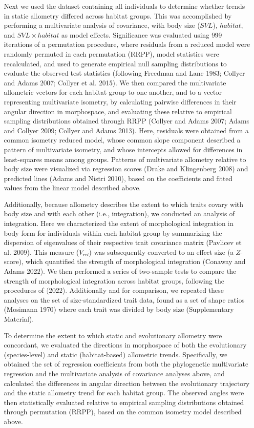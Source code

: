 \documentclass[
  11pt,
]{article}
\begin{document}
Next we used the dataset containing all individuals to determine whether
trends in static allometry differed across habitat groups. This was
accomplished by performing a multivariate analysis of covariance, with
body size (\(SVL\)), \(habitat\), and \(SVL \times habitat\) as model
effects. Significance was evaluated using 999 iterations of a
permutation procedure, where residuals from a reduced model were
randomly permuted in each permutation (RRPP), model statistics were
recalculated, and used to generate empirical null sampling distributions
to evaluate the observed test statistics (following Freedman and Lane
1983; Collyer and Adams 2007; Collyer et al. 2015). We then compared the
multivariate allometric vectors for each habitat group to one another,
and to a vector representing multivariate isometry, by calculating
pairwise differences in their angular direction in morphospace, and
evaluating these relative to empirical sampling distributions obtained
through RRPP (Collyer and Adams 2007; Adams and Collyer 2009; Collyer
and Adams 2013). Here, residuals were obtained from a common isometry
reduced model, whose common slope component described a pattern of
multivariate isometry, and whose intercepts allowed for differences in
least-squares means among groups. Patterns of multivariate allometry
relative to body size were visualized via regression scores (Drake and
Klingenberg 2008) and predicted lines (Adams and Nistri 2010), based on
the coefficients and fitted values from the linear model described
above. \hfill\break

Additionally, because allometry describes the extent to which traits
covary with body size and with each other (i.e., integration), we
conducted an analysis of integration. Here we characterized the extent
of morphological integration in body form for individuals within each
habitat group by summarizing the dispersion of eigenvalues of their
respective trait covariance matrix (Pavlicev et al. 2009). This measure
(\(V_{rel}\)) was subsequently converted to an effect size (a
\(Z\)-score), which quantified the strength of morphological integration
(Conaway and Adams 2022). We then performed a series of two-sample tests
to compare the strength of morphological integration across habitat
groups, following the procedures of (2022). Additionally and for
comparison, we repeated these analyses on the set of size-standardized
trait data, found as a set of shape ratios (Mosimann 1970) where each
trait was divided by body size (Supplementary Material). \hfill\break

To determine the extent to which static and evolutionary allometry were
concordant, we evaluated the directions in morphospace of both the
evolutionary (species-level) and static (habitat-based) allometric
trends. Specifically, we obtained the set of regression coefficients
from both the phylogenetic multivariate regression and the multivariate
analysis of covariance analyses above, and calculated the differences in
angular direction between the evolutionary trajectory and the static
allometry trend for each habitat group. The observed angles were then
statistically evaluated relative to empirical sampling distributions
obtained through permutation (RRPP), based on the common isometry model
described above. \hfill\break
\end{document}
